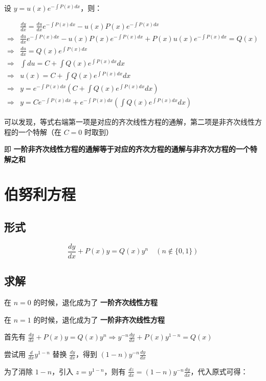 \documentclass[UTF8]{article}
\begin{document}
设 $y=u(x) e^{-\int P(x)dx}$，则：

$$
\begin{aligned}
& \frac{dy}{dx}=\frac{du}{dx} e^{-\int P(x)dx} - u(x)P(x) e^{-\int P(x)dx} \\
\Rightarrow
& \frac{du}{dx} e^{-\int P(x)dx} - u(x)P(x) e^{-\int P(x)dx} + P(x)u(x) e^{-\int P(x)dx} =Q(x) \\
\Rightarrow
& \frac{du}{dx} = Q(x) e^{\int P(x)dx} \\
\Rightarrow
& \int du=C+\int Q(x) e^{\int P(x)dx} dx \\
\Rightarrow
& u(x)=C+\int Q(x) e^{\int P(x)dx} dx \\
\Rightarrow
& y= e^{-\int P(x)dx} \left( C + \int Q(x) e^{\int P(x)dx} dx \right) \\
\Rightarrow
& y= Ce^{-\int P(x)dx} + e^{-\int P(x)dx} \left( \int Q(x) e^{\int P(x)dx} dx \right)
\end{aligned}
$$

可以发现，等式右端第一项是对应的齐次线性方程的通解，第二项是非齐次线性方程的一个特解（在 $C=0$ 时取到）

即 \textbf{一阶非齐次线性方程的通解等于对应的齐次方程的通解与非齐次方程的一个特解之和}

\section{伯努利方程}

\subsection{形式}

$$
\frac{dy}{dx}+P(x)y=Q(x)y^{n} \quad (n \not\in \{0, 1\})
$$

\subsection{求解}

在 $n=0$ 的时候，退化成为了 \textbf{一阶齐次线性方程}

在 $n=1$ 的时候，退化成为了 \textbf{一阶非齐次线性方程}

首先有 $\frac{dy}{dx}+P(x)y=Q(x)y^{n} \Rightarrow y^{-n}\frac{dy}{dx}+P(x)y^{1-n}=Q(x)$

尝试用 $\frac{d}{dx}y^{1-n}$ 替换 $\frac{dy}{dx}$，得到 $(1-n)y^{-n}\frac{dy}{dx}$

为了消除 $1-n$，引入 $z=y^{1-n}$，则有 $\frac{dz}{dx}=(1-n)y^{-n}\frac{dy}{dx}$，代入原式可得：
\end{document}
